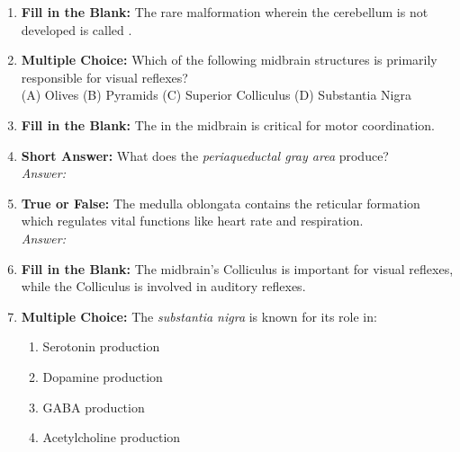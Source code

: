 \begin{enumerate}[label=\textbf{Q1.9.\arabic*}]
      \item \textbf{Fill in the Blank:} The rare malformation wherein the cerebellum is not developed is called \underline{\hspace{3cm}}. \\

      \item \textbf{Multiple Choice:} Which of the following midbrain structures is primarily responsible for visual reflexes? \\
            (A) Olives \quad (B) Pyramids \quad (C) Superior Colliculus \quad (D) Substantia Nigra \\

      \item \textbf{Fill in the Blank:} The \underline{\hspace{3cm}} in the midbrain is critical for motor coordination. \\

      \item \textbf{Short Answer:} What does the \textit{periaqueductal gray area} produce? \\
            \textit{Answer:} \\%

      \item \textbf{True or False:} The medulla oblongata contains the reticular formation which regulates vital functions like heart rate and respiration. \\
            \textit{Answer:} %

      \item \textbf{Fill in the Blank:} The midbrain’s \underline{\hspace{3cm}} Colliculus is important for visual reflexes, while the \underline{\hspace{3cm}} Colliculus is involved in auditory reflexes.

      \item \textbf{Multiple Choice:} The \textit{substantia nigra} is known for its role in:
            \begin{enumerate}[label=(\Alph*)]
                  \item Serotonin production
                  \item Dopamine production
                  \item GABA production
                  \item Acetylcholine production
            \end{enumerate}
\end{enumerate}
\squigglyline
